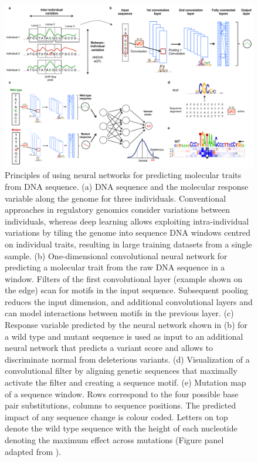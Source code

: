 \begin{figure}[htbp!]
\centering
\includegraphics[width=1.0\textwidth]{genomics}
\caption[Principles of using neural networks for predicting molecular traits from DNA sequence.]{Principles of using neural networks for predicting molecular traits from DNA sequence. (a) DNA sequence and the molecular response variable along the genome for three individuals. Conventional approaches in regulatory genomics consider variations between individuals, whereas deep learning allows exploiting intra-individual variations by tiling the genome into sequence DNA windows centred on individual traits, resulting in large training datasets from a single sample. (b) One-dimensional convolutional neural network for predicting a molecular trait from the raw DNA sequence in a window. Filters of the first convolutional layer (example shown on the edge) scan for motifs in the input sequence. Subsequent pooling reduces the input dimension, and additional convolutional layers and can model interactions between motifs in the previous layer. (c) Response variable predicted by the neural network shown in (b) for a wild type and mutant sequence is used as input to an additional neural network that predicts a variant score and allows to discriminate normal from deleterious variants. (d) Visualization of a convolutional filter by aligning genetic sequences that maximally activate the filter and creating a sequence motif. (e) Mutation map of a sequence window. Rows correspond to the four possible base pair substitutions, columns to sequence positions. The predicted impact of any sequence change is colour coded. Letters on top denote the wild type sequence with the height of each nucleotide denoting the maximum effect across mutations (Figure panel adapted from \citet{alipanahi_predicting_2015}).}
\label{fig:dl_genomics}
\end{figure}


